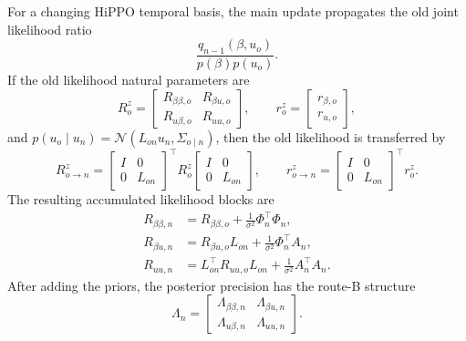 \documentclass[12pt]{article}
\begin{document}
For a changing HiPPO temporal basis, the main update propagates the old joint likelihood
ratio
\begin{equation}
    \frac{q_{n-1}(\beta,u_o)}{p(\beta)p(u_o)}.
\end{equation}
If the old likelihood natural parameters are
\begin{equation}
    R_o^z=
    \begin{bmatrix}
        R_{\beta\beta,o} & R_{\beta u,o}\\
        R_{u\beta,o} & R_{uu,o}
    \end{bmatrix},
    \qquad
    r_o^z=
    \begin{bmatrix}
        r_{\beta,o}\\r_{u,o}
    \end{bmatrix},
\end{equation}
and $p(u_o\mid u_n)=\mathcal{N}(L_{on}u_n,\Sigma_{o\mid n})$, then the old likelihood is
transferred by
\begin{equation}
    R_{o\rightarrow n}^z
    =
    \begin{bmatrix}
        I & 0\\0 & L_{on}
    \end{bmatrix}^{\!\top}
    R_o^z
    \begin{bmatrix}
        I & 0\\0 & L_{on}
    \end{bmatrix},
    \qquad
    r_{o\rightarrow n}^z
    =
    \begin{bmatrix}
        I & 0\\0 & L_{on}
    \end{bmatrix}^{\!\top}
    r_o^z.
\end{equation}
The resulting accumulated likelihood blocks are
\begin{align}
    R_{\beta\beta,n}
    &=R_{\beta\beta,o}+\frac{1}{\sigma^2}\Phi_n^\top\Phi_n,\\
    R_{\beta u,n}
    &=R_{\beta u,o}L_{on}+\frac{1}{\sigma^2}\Phi_n^\top A_n,\\
    R_{uu,n}
    &=L_{on}^\top R_{uu,o}L_{on}+\frac{1}{\sigma^2}A_n^\top A_n.
\end{align}
After adding the priors, the posterior precision has the route-B structure
\begin{equation}
    \Lambda_n=
    \begin{bmatrix}
        \Lambda_{\beta\beta,n} & \Lambda_{\beta u,n}\\
        \Lambda_{u\beta,n} & \Lambda_{uu,n}
    \end{bmatrix}.
\end{equation}
\end{document}
